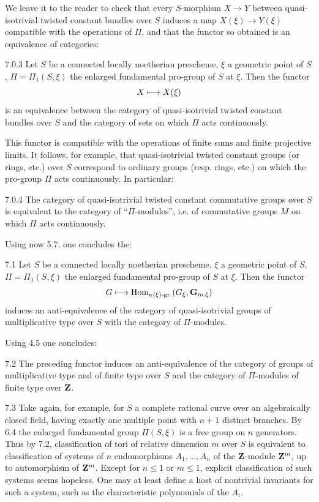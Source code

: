 We leave it to the reader to check that every $S$-morphism $X\to Y$ between quasi-isotrivial twisted constant bundles over $S$ induces a map $X(\xi)\to Y(\xi)$ compatible with the operations of $\Pi$, and that the functor so obtained is an equivalence of categories:
\begin{proposition}{7.0.3}\label{X.7.0.3}
Let $S$ be a connected locally noetherian prescheme, $\xi$ a geometric point of $S$, $\Pi=\Pi_1(S,\xi)$ the enlarged fundamental pro-group of $S$ at $\xi$. Then the functor
\[
X\longmapsto X(\xi)
\]
is an equivalence between the category of quasi-isotrivial twisted constant bundles over $S$ and the category of sets on which $\Pi$ acts continuously.
\end{proposition}
This functor is compatible with the operations of finite sums and finite projective limits. It follows, for example, that quasi-isotrivial twisted constant groups (or rings, etc.) over $S$ correspond to ordinary groups (resp. rings, etc.) on which the pro-group $\Pi$ acts continuously. In particular:
\begin{corollary}{7.0.4}\label{X.7.0.4}
The category of quasi-isotrivial twisted constant commutative groups over $S$ is equivalent to the category of ``$\Pi$-modules'', i.e. of commutative groups $M$ on which $\Pi$ acts continuously.
\end{corollary}
Using now 5.7, one concludes the:
\begin{theorem}{7.1}\label{X.7.1}
Let $S$ be a connected locally noetherian prescheme, $\xi$ a geometric point of $S$, $\Pi=\Pi_1(S,\xi)$ the enlarged fundamental pro-group of $S$ at $\xi$. Then the functor
\[
G\longmapsto\operatorname{Hom}_{\kappa(\xi)\text{-}\mathrm{gr.}}(G_\xi,\mathbf{G}_{\mathrm{m},\xi})
\]
induces an anti-equivalence of the category of quasi-isotrivial groups of multiplicative type over $S$ with the category of $\Pi$-modules.
\end{theorem}
Using 4.5 one concludes:
\begin{corollary}{7.2}\label{X.7.2}
The preceding functor induces an anti-equivalence of the category of groups of multiplicative type and of finite type over $S$ and the category of $\Pi$-modules of finite type over $\mathbf{Z}$.
\end{corollary}
\begin{example}{7.3}\label{X.7.3}
Take again, for example, for $S$ a complete rational curve over an algebraically closed field, having exactly one multiple point with $n+1$ distinct branches. By 6.4 the enlarged fundamental group $\Pi(S,\xi)$ is a free group on $n$ generators. Thus by 7.2, classification of tori of relative dimension $m$ over $S$ is equivalent to classification of systems of $n$ endomorphisms $A_1,\dots,A_n$ of the $\mathbf{Z}$-module $\mathbf{Z}^m$, up to automorphism of $\mathbf{Z}^m$. Except for $n\leq1$ or $m\leq1$, explicit classification of such systems seems hopeless. One may at least define a host of nontrivial invariants for such a system, such as the characteristic polynomials of the $A_i$.
\end{example}
